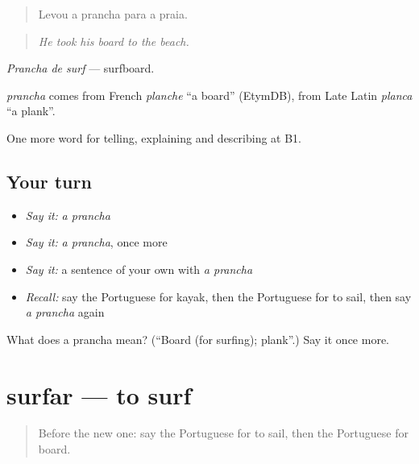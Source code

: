 \begin{quote}
Levou a prancha para a praia.
\end{quote}

\begin{quote}
\emph{He took his board to the beach.}
\end{quote}

\emph{Prancha de surf} — surfboard.

\begin{cousinweb}
\emph{prancha} comes from French \emph{planche} \textquotedblleft{}a board\textquotedblright{} (EtymDB), from Late Latin \emph{planca} \textquotedblleft{}a plank\textquotedblright{}.
\end{cousinweb}

\begin{grammarlens}[title={What you've built}]
One more word for telling, explaining and describing at B1.
\end{grammarlens}

\subsection*{Your turn}
\begin{itemize}
\raggedright
  \item \emph{Say it:} \emph{a prancha}
  \item \emph{Say it:} \emph{a prancha}, once more
  \item \emph{Say it:} a sentence of your own with \emph{a prancha}
  \item \emph{Recall:} say the Portuguese for kayak, then the Portuguese for to sail, then say \emph{a prancha} again
\end{itemize}

\begin{tcolorbox}[breakable,colback=teal!4,colframe=teal!35!black,title={Before you move on}]
What does a prancha mean? (\textquotedblleft{}Board (for surfing); plank\textquotedblright{}.) Say it once more.
\end{tcolorbox}
\section[surfar]{surfar — to surf}

\label{lesson:PT-C506-surfar}



\begin{quote}
Before the new one: say the Portuguese for to sail, then the Portuguese for board.
\end{quote}

